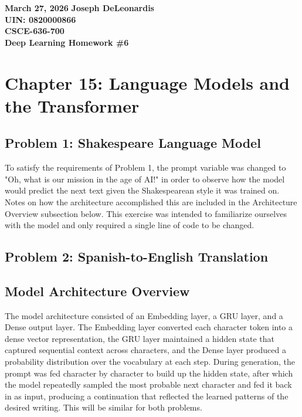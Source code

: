 \documentclass[11pt]{article}
\begin{document}
\noindent
\textbf{March 27, 2026} \hfill \textbf{Joseph DeLeonardis} \\
\textbf{UIN: 0820000866} \\
\textbf{CSCE-636-700} \\
\textbf{Deep Learning Homework \#6}

\section*{Chapter 15: Language Models and the Transformer}

\subsection*{Problem 1: Shakespeare Language Model}
To satisfy the requirements of Problem 1, the prompt variable was changed to "Oh, what is our mission in the age of AI!" in order to observe how the model would predict the next text given the Shakespearean style it was trained on. Notes on how the architecture accomplished this are included in the Architecture Overview subsection below. This exercise was intended to familiarize ourselves with the model and only required a single line of code to be changed.





\subsection*{Problem 2: Spanish-to-English Translation}



\subsection*{Model Architecture Overview}
The model architecture consisted of an Embedding layer, a GRU layer, and a Dense output layer. The Embedding layer converted each character token into a dense vector representation, the GRU layer maintained a hidden state that captured sequential context across characters, and the Dense layer produced a probability distribution over the vocabulary at each step. During generation, the prompt was fed character by character to build up the hidden state, after which the model repeatedly sampled the most probable next character and fed it back in as input, producing a continuation that reflected the learned patterns of the desired writing. This will be similar for both problems. 
\end{document}
